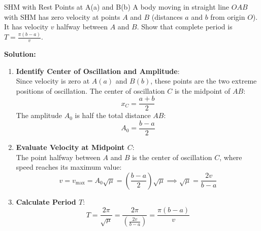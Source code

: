 \begin{examplebox}{SHM with Rest Points at A(a) and B(b)}
A body moving in straight line $OAB$ with SHM has zero velocity at points $A$ and $B$ (distances $a$ and $b$ from origin $O$). It has velocity $v$ halfway between $A$ and $B$. Show that complete period is $T = \frac{\pi(b - a)}{v}$.

\tcblower
\textbf{Solution:}

\begin{enumerate}[leftmargin=1.5em]
    \item \textbf{Identify Center of Oscillation and Amplitude}:\\
    Since velocity is zero at $A(a)$ and $B(b)$, these points are the two extreme positions of oscillation.
    The center of oscillation $C$ is the midpoint of $AB$:
    \begin{equation*}
        x_C = \frac{a + b}{2}
    \end{equation*}
    The amplitude $A_0$ is half the total distance $AB$:
    \begin{equation*}
        A_0 = \frac{b - a}{2}
    \end{equation*}

    \item \textbf{Evaluate Velocity at Midpoint $C$}:\\
    The point halfway between $A$ and $B$ is the center of oscillation $C$, where speed reaches its maximum value:
    \begin{equation*}
        v = v_{\max} = A_0 \sqrt{\mu} = \left(\frac{b - a}{2}\right) \sqrt{\mu} \implies \sqrt{\mu} = \frac{2v}{b - a}
    \end{equation*}

    \item \textbf{Calculate Period $T$}:\\
    \begin{equation*}
        T = \frac{2\pi}{\sqrt{\mu}} = \frac{2\pi}{\left(\frac{2v}{b - a}\right)} = \frac{\pi(b - a)}{v}
    \end{equation*}
\end{enumerate}
\end{examplebox}


